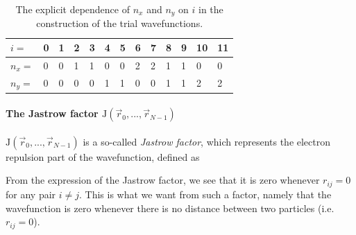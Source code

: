 \begin{table}[h!]
	\centering
	\begin{tabular}{lllllllllllll}
	\toprule 
	$ i = $ & 0 & 1 & 2 & 3 & 4 & 5 & 6 & 7 & 8 & 9 & 10 & 11 \\
	\midrule
	$n_x = $ & 0 & 0 & 1 & 1 & 0 & 0 & 2 & 2 & 1 & 1 & 0 & 0 \\
	$n_y = $ & 0 & 0 & 0 & 0 & 1 & 1 & 0 & 0 & 1 & 1 & 2 & 2 \\
	\bottomrule
	\end{tabular}
	\caption{The explicit dependence of $n_x$ and $n_y$ on $i$ in the construction of the trial wavefunctions.}
	\label{tab:dependence_of_nx_on_i}
\end{table}










\paragraph{The Jastrow factor $\textrm{J} (\vec r_0, ... , \vec r_{N-1} )$} \label{sec:jastrow}

$\textrm{J} (\vec r_0, ... , \vec r_{N-1} )$ is a so-called \textit{Jastrow factor}, which represents the electron repulsion part of the wavefunction, defined as

\eqs
{}
\eqf

From the expression of the Jastrow factor, we see that it is zero whenever $r_{ij} = 0$ for any pair $i\neq j$. 
This is what we want from such a factor, namely that the wavefunction is zero whenever there is no distance between two particles (i.e. $r_{ij} = 0$).















